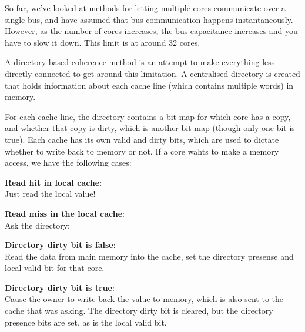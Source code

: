 So far, we've looked at methods for letting multiple cores communicate over a
single bus, and have assumed that bus communication happens instantaneously.
However, as the number of cores increases, the bus capacitance increases and you
have to slow it down. This limit is at around 32 cores.

A directory based coherence method is an attempt to make everything less
directly connected to get around this limitation. A centralised directory is
created that holds information about each cache line (which contains multiple
words) in memory.

For each cache line, the directory contains a bit map for which core has a copy,
and whether that copy is dirty, which is another bit map (though only one bit is
true). Each cache has its own valid and dirty bits, which are used to dictate
whether to write back to memory or not. If a core wahts to make a memory access,
we have the following cases:

\begin{description}
  \item \textbf{Read hit in local cache}:\\
    Just read the local value!
  \item \textbf{Read miss in the local cache}:\\
    Ask the directory:
    \begin{description}
      \item \textbf{Directory dirty bit is false}:\\
        Read the data from main memory into the cache, set the directory
        presense and local valid bit for that core.
      \item \textbf{Directory dirty bit is true}:\\
        Cause the owner to write back the value to memory, which is also sent to
        the cache that was asking. The directory dirty bit is cleared, but the
        directory presence bits are set, as is the local valid bit.
    \end{description}
\end{description}
